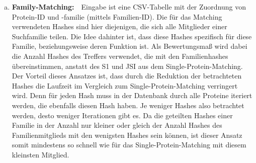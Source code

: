 \begin{enumerate}[a)]
                Um das zu umgehen, wird der \ac{JSI} verwendet, einem Maß, das die Übereinstimmung zweier Mengen A und B wie folgt bewertet:
                \begin{equation}
                    \label{equ:jsi}
                    JSI(A, B)=\frac{|A \cap B|}{|A \cup B|}
                \end{equation}
                Dieser Index nimmt einen Wert von 0 an, wenn beide Mengen disjunkt sind, und nähert sich der 1 je größer die Schnittmenge ist. Im Fall des Vergleichs zweier \acp{CM}, also zwei Hash-Mengen, wird hier bewertet, wie viele Kanten sich die beiden \acp{CM} positionsunabhängig teilen. Durch diese Unabhängigkeit reicht der JSI alleine nicht als Score aus, sodass nur in Kombination/Multiplikation mit dem S1 ein robuster Score entsteht, da beide zusammen ihre Schwächen aufheben. Der \ac{JSI} in  beträgt $\frac{4}{14} \approx 0.286$, da die Schnittmenge beider Hashmengen hier gleichzeitig den S1-Score bilden und die restlichen Hashes disjunkt zueinander sind. Der S1 wäre nur noch 3, wenn eine der markierten Kanten an einer anderen Position wäre, wobei der \ac{JSI} davon unberührt bliebe.

            \item {}
                \textbf{Family-Matching:}\ \ Eingabe ist eine \ac{CSV}-Tabelle mit der Zuordnung von Protein-ID und -familie (mittels Familien-ID). Die für das Matching verwendeten Hashes sind hier diejenigen, die sich alle Mitglieder einer Suchfamilie teilen. Die Idee dahinter ist, dass diese Hashes spezifisch für diese Familie, beziehungsweise deren Funktion ist. Als Bewertungsmaß wird dabei die Anzahl Hashes des Treffers verwendet, die mit den Familienhashes übereinstimmen, anstatt des S1 und \ac{JSI} aus dem Single-Protein-Matching. Der Vorteil dieses Ansatzes ist, dass durch die Reduktion der betrachteten Hashes die Laufzeit im Vergleich zum Single-Protein-Matching verringert wird. Denn für jeden Hash muss in der Datenbank durch alle Proteine iteriert werden, die ebenfalls diesen Hash haben. Je weniger Hashes also betrachtet werden, desto weniger Iterationen gibt es. Da die geteilten Hashes einer Familie in der Anzahl nur kleiner oder gleich der Anzahl Hashes des Familienmitglieds mit den wenigsten Hashes sein können, ist dieser Ansatz somit mindestens so schnell wie für das Single-Protein-Matching mit diesem kleinsten Mitglied.


\end{enumerate}

